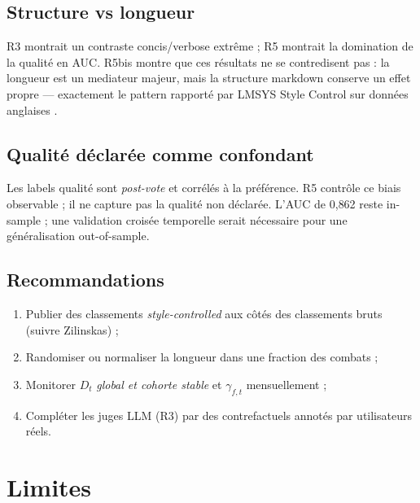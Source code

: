 \documentclass[11pt,a4paper]{article}
\begin{document}
\subsection{Structure vs longueur}

R3 montrait un contraste concis/verbose extrême ; R5 montrait la domination de la
qualité en AUC. R5bis montre que ces résultats ne se contredisent pas : la longueur
est un mediateur majeur, mais la structure markdown conserve un effet propre ---
exactement le pattern rapporté par LMSYS Style Control sur données anglaises
\citep{li2024crowdsourced}.

\subsection{Qualité déclarée comme confondant}

Les labels qualité sont \emph{post-vote} et corrélés à la préférence. R5 contrôle
ce biais observable ; il ne capture pas la qualité non déclarée. L'AUC de 0{,}862
reste in-sample ; une validation croisée temporelle serait nécessaire pour une
 généralisation out-of-sample.

\subsection{Recommandations}

\begin{enumerate}
  \item Publier des classements \emph{style-controlled} aux côtés des classements bruts
        (suivre Zilinskas) ;
  \item Randomiser ou normaliser la longueur dans une fraction des combats ;
  \item Monitorer $D_t$ \emph{global et cohorte stable} et $\gamma_{f,t}$ mensuellement ;
  \item Compléter les juges LLM (R3) par des contrefactuels annotés par utilisateurs réels.
\end{enumerate}

\section{Limites}
\label{sec:limits}
\end{document}

